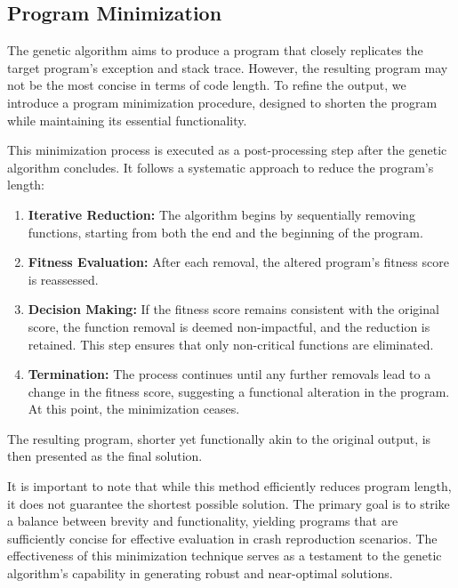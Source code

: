     \subsection{Program Minimization}
        The genetic algorithm aims to produce a program that closely replicates the target program's exception and stack 
        trace. However, the resulting program may not be the most concise in terms of code length. To refine the output, 
        we introduce a program minimization procedure, designed to shorten the program while maintaining its essential 
        functionality.
    
        This minimization process is executed as a post-processing step after the genetic algorithm concludes. It 
        follows a systematic approach to reduce the program's length:
    
        \begin{enumerate}
            \item \textbf{Iterative Reduction:} The algorithm begins by sequentially removing functions, starting from 
                both the end and the beginning of the program.
            \item \textbf{Fitness Evaluation:} After each removal, the altered program's fitness score is reassessed.
            \item \textbf{Decision Making:} If the fitness score remains consistent with the original score, the 
                function removal is deemed non-impactful, and the reduction is retained. This step ensures that only 
                non-critical functions are eliminated.
            \item \textbf{Termination:} The process continues until any further removals lead to a change in the fitness 
                score, suggesting a functional alteration in the program. At this point, the minimization ceases.
        \end{enumerate}
    
        The resulting program, shorter yet functionally akin to the original output, is then presented as the final 
        solution.
    
        It is important to note that while this method efficiently reduces program length, it does not guarantee the 
        shortest possible solution. The primary goal is to strike a balance between brevity and functionality, yielding 
        programs that are sufficiently concise for effective evaluation in crash reproduction scenarios. The 
        effectiveness of this minimization technique serves as a testament to the genetic algorithm's capability in 
        generating robust and near-optimal solutions.
    
